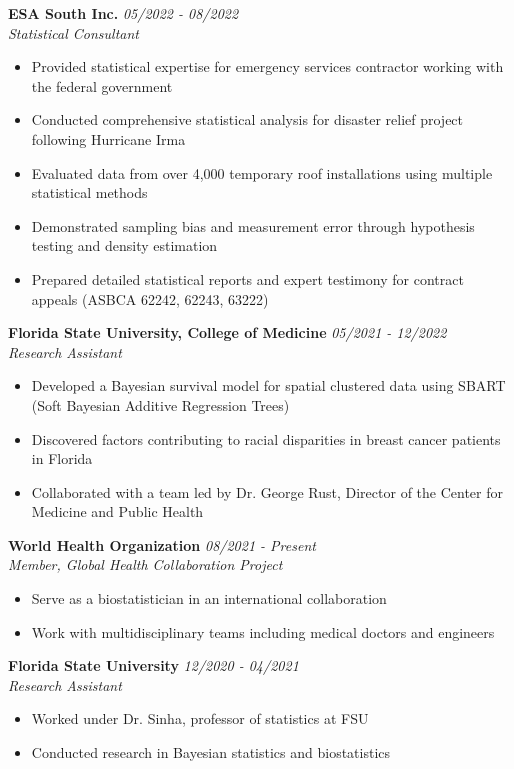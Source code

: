 \documentclass[11pt,a4paper]{article}
\newcommand{\entry}[4]{
  \noindent\textbf{#1} \hfill \textit{#2}\\
  \textit{#3}\\
  #4
  \vspace{0.4cm}
}
\begin{document}
\entry{ESA South Inc.}{05/2022 - 08/2022}{Statistical Consultant}{
  \begin{itemize}[leftmargin=*,noitemsep,topsep=0pt]
    \item Provided statistical expertise for emergency services contractor working with the federal government
    \item Conducted comprehensive statistical analysis for disaster relief project following Hurricane Irma
    \item Evaluated data from over 4,000 temporary roof installations using multiple statistical methods
    \item Demonstrated sampling bias and measurement error through hypothesis testing and density estimation
    \item Prepared detailed statistical reports and expert testimony for contract appeals (ASBCA 62242, 62243, 63222)
  \end{itemize}
}

\entry{Florida State University, College of Medicine}{05/2021 - 12/2022}{Research Assistant}{
  \begin{itemize}[leftmargin=*,noitemsep,topsep=0pt]
    \item Developed a Bayesian survival model for spatial clustered data using SBART (Soft Bayesian Additive Regression Trees)
    \item Discovered factors contributing to racial disparities in breast cancer patients in Florida
    \item Collaborated with a team led by Dr. George Rust, Director of the Center for Medicine and Public Health
  \end{itemize}
}

\entry{World Health Organization}{08/2021 - Present}{Member, Global Health Collaboration Project}{
  \begin{itemize}[leftmargin=*,noitemsep,topsep=0pt]
    \item Serve as a biostatistician in an international collaboration
    \item Work with multidisciplinary teams including medical doctors and engineers
  \end{itemize}
}

\entry{Florida State University}{12/2020 - 04/2021}{Research Assistant}{
  \begin{itemize}[leftmargin=*,noitemsep,topsep=0pt]
    \item Worked under Dr. Sinha, professor of statistics at FSU
    \item Conducted research in Bayesian statistics and biostatistics
  \end{itemize}
}
\end{document}
